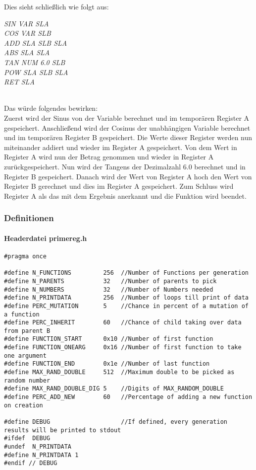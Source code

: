 \documentclass[a4paper,12pt]{article}
\begin{document}
\noindent Dies sieht schließlich wie folgt aus:

\noindent 
\begin{center}
\textit{
SIN VAR SLA\\ COS VAR SLB \\
ADD SLA SLB SLA\\
ABS SLA SLA\\
TAN NUM 6.0 SLB\\
POW SLA SLB SLA\\
RET SLA
}
\end{center}

\noindent \\ Das würde folgendes bewirken:\\
Zuerst wird der Sinus von der Variable berechnet und im temporären Register A gespeichert. Anschließend wird der Cosinus der unabhängigen Variable berechnet und im temporären Register B gespeichert. Die Werte dieser Register werden nun miteinander addiert und wieder im Register A gespeichert. Von dem Wert in Register A wird nun der Betrag genommen und wieder in Register A zurückgespeichert. Nun wird der Tangens der Dezimalzahl 6.0 berechnet und in Register B gespeichert. Danach wird der Wert von Register A hoch den Wert von Register B gerechnet und dies im Register A gespeichert. Zum Schluss wird Register A als das mit dem Ergebnis anerkannt und die Funktion wird beendet. 

\newpage
\subsubsection{Definitionen}
\paragraph{Headerdatei primereg.h}

\begin{verbatim}
#pragma once

#define N_FUNCTIONS         256  //Number of Functions per generation
#define N_PARENTS           32   //Number of parents to pick
#define N_NUMBERS           32   //Number of Numbers needed
#define N_PRINTDATA         256  //Number of loops till print of data
#define PERC_MUTATION       5    //Chance in percent of a mutation of a function
#define PERC_INHERIT        60   //Chance of child taking over data from parent B
#define FUNCTION_START      0x10 //Number of first function
#define FUNCTION_ONEARG     0x16 //Number of first function to take one argument
#define FUNCTION_END        0x1e //Number of last function
#define MAX_RAND_DOUBLE     512  //Maximum double to be picked as random number
#define MAX_RAND_DOUBLE_DIG 5    //Digits of MAX_RANDOM_DOUBLE
#define PERC_ADD_NEW        60   //Percentage of adding a new function on creation

#define DEBUG                    //If defined, every generation results will be printed to stdout
#ifdef  DEBUG
#undef  N_PRINTDATA
#define N_PRINTDATA 1
#endif // DEBUG
\end{verbatim}
\newpage
\end{document}
